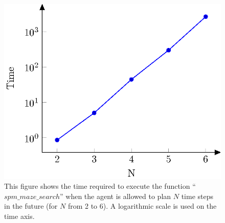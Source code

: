 \documentclass[twoside,11pt]{article}
\begin{document}
\begin{figure}[H]
\begin{center}
	\includegraphics[scale=0.8]{BTAI-figure4}
\end{center}
\caption{This figure shows the time required to execute the function ``$spm\_maze\_search$'' when the agent is allowed to plan $N$ time steps in the future (for $N$ from 2 to 6). A logarithmic scale is used on the time axis.}
\label{fig:exp_explosion}
\end{figure}
\end{document}
